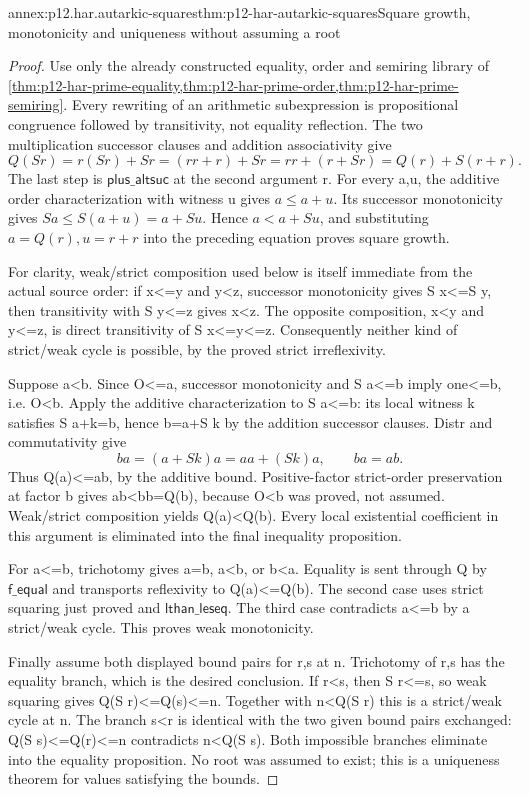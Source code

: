 \begin{annexitem}{annex:p12.har.autarkic-squares}{thm:p12-har-autarkic-squares}{Square growth, monotonicity and uniqueness without assuming a root}
\begin{proof}
Use only the already constructed equality, order and semiring library
of \cref{thm:p12-har-prime-equality,thm:p12-har-prime-order,thm:p12-har-prime-semiring}.
Every rewriting of an arithmetic subexpression is propositional
congruence followed by transitivity, not equality reflection.
The two multiplication successor clauses and addition associativity give
\[
 Q(S r)=r(S r)+S r=(rr+r)+S r=rr+(r+S r)=Q(r)+S(r+r).
\]
The last step is \(\mathsf{plus\_altsuc}\) at the second argument r.
For every a,u, the additive order characterization with witness u
gives \(a\le a+u\). Its successor monotonicity gives
\(S a\le S(a+u)=a+S u\). Hence \(a<a+S u\), and substituting
\(a=Q(r),u=r+r\) into the preceding equation proves square growth.

For clarity, weak/strict composition used below is itself immediate
from the actual source order: if x<=y and y<z, successor monotonicity
gives S x<=S y, then transitivity with S y<=z gives x<z.
The opposite composition, x<y and y<=z, is direct transitivity of
S x<=y<=z. Consequently neither kind of strict/weak cycle is possible,
by the proved strict irreflexivity.

Suppose a<b. Since O<=a, successor monotonicity and S a<=b imply
one<=b, i.e. O<b. Apply the additive characterization to S a<=b:
its local witness k satisfies S a+k=b, hence b=a+S k by the
addition successor clauses. Distr and commutativity give
\[
 ba=(a+S k)a=aa+(S k)a,\qquad ba=ab.
\]
Thus Q(a)<=ab, by the additive bound. Positive-factor strict-order
preservation at factor b gives ab<bb=Q(b), because O<b was proved,
not assumed. Weak/strict composition yields Q(a)<Q(b).
Every local existential coefficient in this argument is eliminated
into the final inequality proposition.

For a<=b, trichotomy gives a=b, a<b, or b<a. Equality is sent through
Q by \(\mathsf{f\_equal}\) and transports reflexivity to Q(a)<=Q(b). The second
case uses strict squaring just proved and \(\mathsf{lthan\_leseq}\). The third case
contradicts a<=b by a strict/weak cycle. This proves weak monotonicity.

Finally assume both displayed bound pairs for r,s at n. Trichotomy
of r,s has the equality branch, which is the desired conclusion.
If r<s, then S r<=s, so weak squaring gives Q(S r)<=Q(s)<=n.
Together with n<Q(S r) this is a strict/weak cycle at n. The branch
s<r is identical with the two given bound pairs exchanged:
Q(S s)<=Q(r)<=n contradicts n<Q(S s). Both impossible branches
eliminate into the equality proposition. No root was assumed to exist;
this is a uniqueness theorem for values satisfying the bounds.
\end{proof}
\end{annexitem}

